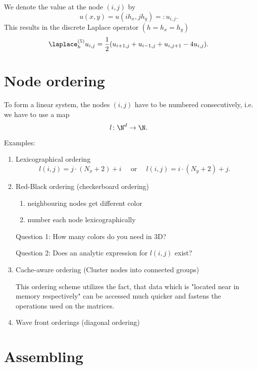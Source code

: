 We denote the value at the node $(i,j)$ by
\[
	u(x,y)=u(ih_{x},jh_{y})=:u_{i,j}
.\] 
This results in the discrete Laplace operator $(h=h_{x}=h_{y})$
\[
	\laplace_{h}^{(5)}u_{i,j}=\frac{1}{2}(u_{i+1,j}+u_{i-1,j} +u_{i,j+1} - 4u_{i,j})
.\]

\section{Node ordering}%
\label{sec:Node ordering}
To form a linear system, the nodes $(i,j)$ have to be numbered consecutively, i.e. we have to use a map
\[
	l\colon \N^{d} \rightarrow \N
.\] 

Examples:

\begin{enumerate}[label=\alph{enumi})]
	\item  Lexicographical ordering
		\[
			l(i,j) = j \cdot (N_{x} + 2) + i 
			\quad\text{ or }\quad
			l(i,j) = i \cdot (N_{y} + 2) + j
		.\] 

	\item Red-Black ordering (checkerboard ordering)

		\begin{enumerate}[label=\arabic{enumii})]
			\item neighbouring nodes get different color
			\item number each node lexicographically
		\end{enumerate}


		Question 1: How many colors do you need in 3D?

		Question 2: Does an analytic expression for $l(i,j)$ exist?
	\item Cache-aware ordering (Cluster nodes into connected groups)

		
		This ordering scheme utilizes the fact, that data which is "located near in memory respectively" can be accessed much quicker and fastens the operations used on the matrices.

	\item Wave front orderings (diagonal ordering)

\end{enumerate}

\section{Assembling}%
\label{sec:Assembling}

